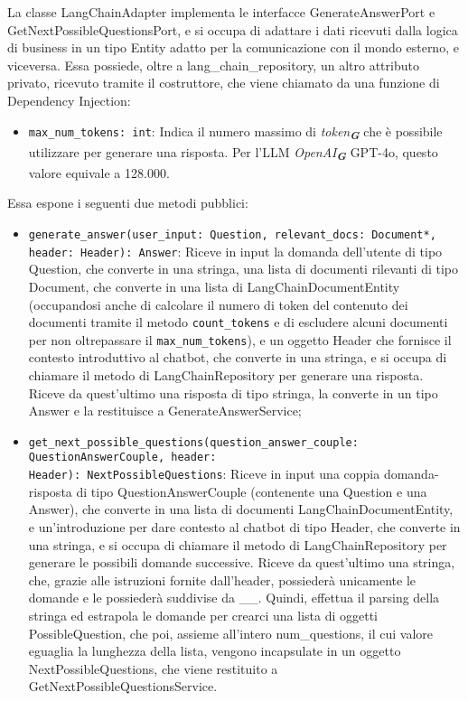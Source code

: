 \label{sec:langchain_adapter}
La classe LangChainAdapter implementa le interfacce GenerateAnswerPort e GetNextPossibleQuestionsPort, e si occupa di adattare i dati ricevuti dalla logica di business in un tipo Entity adatto per la comunicazione con il mondo esterno, e viceversa. 
Essa possiede, oltre a lang\_chain\_repository, un altro attributo privato, ricevuto tramite il costruttore, che viene chiamato da una funzione di Dependency Injection:
\begin{itemize}
    \item \texttt{max\_num\_tokens: int}: Indica il numero massimo di \emph{token}\textsubscript{\textbf{\textit{G}}} che è possibile utilizzare per generare una risposta. Per l'LLM \emph{OpenAI}\textsubscript{\textbf{\textit{G}}} GPT-4o, questo valore equivale a 128.000.
\end{itemize}
Essa espone i seguenti due metodi pubblici:
\begin{itemize}
    \item \texttt{generate\_answer(user\_input: Question, relevant\_docs: Document*, header: Header): Answer}: Riceve in input la domanda dell'utente di tipo Question, che converte in una stringa, una lista di documenti rilevanti di tipo Document, che converte in una lista di LangChainDocumentEntity (occupandosi anche di calcolare il numero di token del contenuto dei documenti tramite il metodo \texttt{count\_tokens} e di escludere alcuni documenti per non oltrepassare il \texttt{max\_num\_tokens}), e un oggetto Header che fornisce il contesto introduttivo al chatbot, che converte in una stringa, e si occupa di chiamare il metodo di LangChainRepository per generare una risposta. Riceve da quest'ultimo una risposta di tipo stringa, la converte in un tipo Answer e la restituisce a GenerateAnswerService;
    \item \texttt{get\_next\_possible\_questions(question\_answer\_couple: QuestionAnswerCouple, header:\\ Header): NextPossibleQuestions}: Riceve in input una coppia domanda-risposta di tipo QuestionAnswerCouple (contenente una Question e una Answer), che converte in una lista di documenti LangChainDocumentEntity, e un'introduzione per dare contesto al chatbot di tipo Header, che converte in una stringa, e si occupa di chiamare il metodo di LangChainRepository per generare le possibili domande successive. Riceve da quest'ultimo una stringa, che, grazie alle istruzioni fornite dall'header, possiederà unicamente le domande e le possiederà suddivise da \_\_. Quindi, effettua il parsing della stringa ed estrapola le domande per crearci una lista di oggetti PossibleQuestion, che poi, assieme all'intero num\_questions, il cui valore eguaglia la lunghezza della lista, vengono incapsulate in un oggetto NextPossibleQuestions, che viene restituito a GetNextPossibleQuestionsService.
\end{itemize}
